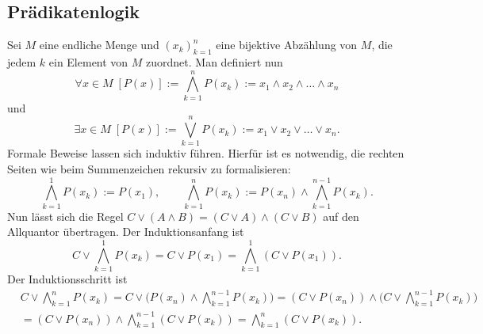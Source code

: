 \documentclass[a4paper,11pt,fleqn,twoside]{scrartcl}
\numberwithin{equation}{section}
\begin{document}
\subsection{Prädikatenlogik}
Sei $M$ eine endliche Menge und $(x_k)_{k=1}^n$ eine bijektive
Abzählung von $M$, die jedem $k$ ein Element von $M$ zuordnet.
Man definiert nun
\begin{equation}
\forall x{\in}M\;[P(x)] := \bigwedge_{k=1}^n P(x_k) := x_1\land x_2\land\ldots\land x_n
\end{equation}
und
\begin{equation}
\exists x{\in}M\;[P(x)] := \bigvee_{k=1}^n P(x_k) := x_1\lor x_2\lor\ldots\lor x_n.
\end{equation}
Formale Beweise lassen sich induktiv führen. Hierfür ist es notwendig,
die rechten Seiten wie beim Summenzeichen rekursiv zu formalisieren:
\begin{equation}
\bigwedge_{k=1}^1 P(x_k) := P(x_1),\qquad
\bigwedge_{k=1}^n P(x_k) := P(x_n)\land\bigwedge_{k=1}^{n-1} P(x_k).
\end{equation}
Nun lässt sich die Regel $C\lor (A\land B)=(C\lor A)\land(C\lor B)$
auf den Allquantor übertragen. Der Induktionsanfang ist
\begin{equation}
C\lor\bigwedge_{k=1}^1 P(x_k) = C\lor P(x_1) = \bigwedge_{k=1}^1 (C\lor P(x_1)).
\end{equation}
Der Induktionsschritt ist
\begin{align}
& C\lor\!\bigwedge_{k=1}^n P(x_k)
= C\lor\bigg(P(x_n)\land\bigwedge_{k=1}^{n-1} P(x_k)\bigg)
= (C\lor P(x_n))\land\bigg(C\lor\!\bigwedge_{k=1}^{n-1} P(x_k)\bigg)\\
&= (C\lor P(x_n))\land\bigwedge_{k=1}^{n-1} (C\lor P(x_k))
= \bigwedge_{k=1}^{n} (C\lor P(x_k)).
\end{align}
\end{document}

